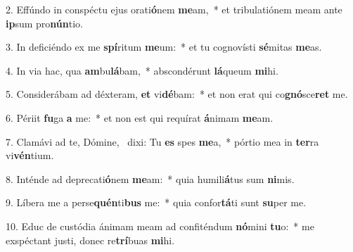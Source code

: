 2. Effúndo in conspéctu ejus orati\textbf{ó}nem \textbf{me}am,~*  et tribulatiónem meam ante \textbf{ip}sum pro\textbf{nún}tio.\

3. In deficiéndo ex me \textbf{spí}ritum \textbf{me}um:~*  et tu cognovísti \textbf{sé}mitas \textbf{me}as.\

4. In via hac, qua \textbf{am}bu\textbf{lá}bam,~*  abscondérunt \textbf{lá}queum \textbf{mi}hi.\

5. Considerábam ad déxteram, \textbf{et} vi\textbf{dé}bam:~*  et non erat qui co\textbf{gnó}sce\textbf{ret} me.\

6. Périit \textbf{fu}ga \textbf{a} me:~*  et non est qui requírat \textbf{á}nimam \textbf{me}am.\

7. Clamávi ad te, Dómine, \dag\  dixi: Tu \textbf{es} spes \textbf{me}a,~*  pórtio mea in \textbf{ter}ra vi\textbf{vén}tium.\

8. Inténde ad deprecati\textbf{ó}nem \textbf{me}am:~*  quia humili\textbf{á}tus sum \textbf{ni}mis.\

9. Líbera me a perse\textbf{quén}ti\textbf{bus} me:~*  quia confor\textbf{tá}ti sunt \textbf{su}per me.\

10. Educ de custódia ánimam meam ad confiténdum \textbf{nó}mini \textbf{tu}o:~*  me exspéctant justi, donec re\textbf{trí}buas \textbf{mi}hi.\

